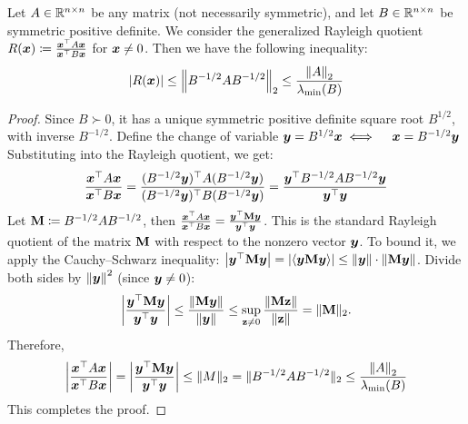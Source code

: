 \documentclass[numsec,webpdf,modern,medium,namedate]{oup-authoring-template}
\theoremstyle{thmstyleone}%
\theoremstyle{thmstyletwo}%
\theoremstyle{thmstylethree}%
\begin{document}
\begin{lemma}\label{lem:raleigh-bound}
Let $A \in \mathbb{R}^{n \times n}$  be any matrix (not necessarily symmetric), and let $B \in \mathbb{R}^{n \times n}$ be symmetric positive definite. We consider the generalized Rayleigh quotient $ R(\boldsymbol{x}) \coloneq \frac{\boldsymbol{x}^\top A \boldsymbol{x}}{\boldsymbol{x}^\top B \boldsymbol{x}}$ for $\boldsymbol{x} \neq 0$. Then we have the following inequality:
\begin{eqnarray*}
    \left| R(\boldsymbol{x}) \right| \leq \left\lVert  B^{-1/2} A B^{-1/2} \right\rVert_2 \leq \dfrac{\left\lVert A \right\rVert_2}{\lambda_{\min}(B)}
\end{eqnarray*}
\end{lemma}

\begin{proof}
Since $B \succ 0$, it has a unique symmetric positive definite square root $B^{1/2}$, with inverse $B^{-1/2}$. Define the change of variable $\boldsymbol{y} = B^{1/2} \boldsymbol{x} \iff \quad \boldsymbol{x} = B^{-1/2} \boldsymbol{y}$
Substituting into the Rayleigh quotient, we get:
\begin{align*}
\frac{\boldsymbol{x}^\top A \boldsymbol{x}}{\boldsymbol{x}^\top B \boldsymbol{x}} 
= \frac{(B^{-1/2} \boldsymbol{y})^\top A (B^{-1/2} \boldsymbol{y})}{(B^{-1/2} \boldsymbol{y})^\top B (B^{-1/2} \boldsymbol{y})} = \frac{\boldsymbol{y}^\top B^{-1/2} A B^{-1/2} \boldsymbol{y}}{\boldsymbol{y}^\top \boldsymbol{y}}
\end{align*}
Let $ \mathbf{M} \coloneqq B^{-1/2} A B^{-1/2}$, then $\frac{\boldsymbol{x}^\top A \boldsymbol{x}}{\boldsymbol{x}^\top B \boldsymbol{x}} = \frac{\boldsymbol{y}^\top \mathbf{M} \boldsymbol{y}}{\boldsymbol{y}^\top \boldsymbol{y}}$. This is the standard Rayleigh quotient of the matrix $\mathbf{M}$ with respect to the nonzero vector $\boldsymbol{y}$. To bound it, we apply the Cauchy–Schwarz inequality:
$\left|\boldsymbol{y}^\top \mathbf{M} \boldsymbol{y}\right| = \left|\langle \boldsymbol{y} \mathbf{M} \boldsymbol{y} \rangle\right| \leq \|\boldsymbol{y}\| \cdot \|\mathbf{M} \boldsymbol{y}\|$. Divide both sides by $\left\lVert \boldsymbol{y} \right\rVert^2$ (since  $\boldsymbol{y} \neq 0$):
$$
\left| \frac{\boldsymbol{y}^\top \mathbf{M} \boldsymbol{y}}{\boldsymbol{y}^\top \boldsymbol{y}} \right| \leq \frac{\|\mathbf{M} \boldsymbol{y}\|}{\|\boldsymbol{y}\|} \leq \sup_{\mathbf{z} \neq 0} \frac{\|\mathbf{M} \mathbf{z}\|}{\|\mathbf{z}\|} = \|\mathbf{M}\|_2.
$$
Therefore,
$$
\left| \frac{\boldsymbol{x}^\top A \boldsymbol{x}}{\boldsymbol{x}^\top B \boldsymbol{x}} \right| 
= \left| \frac{\boldsymbol{y}^\top \mathbf{M} \boldsymbol{y}}{\boldsymbol{y}^\top \boldsymbol{y}} \right| 
\leq \|M\|_2 = \|B^{-1/2} A B^{-1/2}\|_2 \leq \dfrac{\left\lVert A \right\rVert_2}{\lambda_{\min}(B)}
$$
This completes the proof. 
\end{proof}
\end{document}
